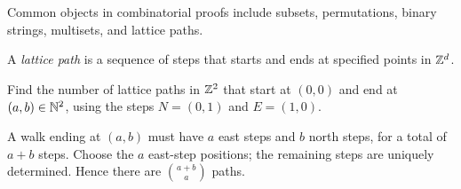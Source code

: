 Common objects in combinatorial proofs include subsets, permutations, binary strings, multisets, and lattice paths.
\begin{definition}
A \textit{lattice path} is a sequence of steps that starts and ends at specified points in $\mathbb{Z}^d$.
\end{definition}
\begin{example}
Find the number of lattice paths in $\mathbb{Z}^2$ that start at $(0,0)$ and end at $(a,b)\in\mathbb{N}^2$, using the steps $N=(0,1)$ and $E=(1,0)$.\par\medskip
A walk ending at $(a,b)$ must have $a$ east steps and $b$ north steps, for a total of $a+b$ steps. Choose the $a$ east-step positions; the remaining steps are uniquely determined. Hence there are $\displaystyle\binom{a+b}{a}$ paths.
\end{example}
